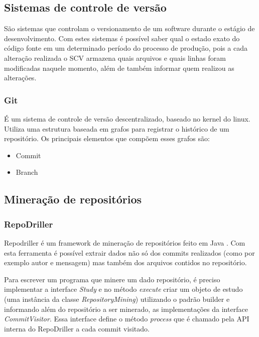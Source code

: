\documentclass[a4paper,12pt]{article}
\numberwithin{figure}{section}
\begin{document}
\subsection{Sistemas de controle de versão}%
\label{sec:scv}
São sistemas que controlam o versionamento de um software durante o estágio de desenvolvimento. Com estes sistemas é possível saber qual o estado exato do código fonte em um determinado período do processo de produção, pois a cada alteração realizada o SCV armazena quais arquivos e quais linhas foram modificadas naquele momento, além de também informar quem realizou as alterações.

\subsubsection{Git}%
É um sistema de controle de versão descentralizado, baseado no kernel do linux. Utiliza uma estrutura baseada em grafos para registrar o histórico de um repositório. Os principais elementos que compõem esses grafos são:

\begin{itemize}
\item{Commit}
\item{Branch}
\end{itemize}






\subsection{Mineração de repositórios}%
\label{sec:mining}


\subsubsection{RepoDriller}%
\label{sec:repodriller}
Repodriller é um framework de mineração de repositórios feito em Java  \cite{repodriller}. Com esta ferramenta é possível extrair dados não só dos commits realizados (como por exemplo autor e mensagem) mas também dos arquivos contidos no repositório.

Para escrever um programa que minere um dado repositório, é preciso implementar a interface \textit{Study} e no método \textit{execute} criar um objeto de estudo (uma instância da classe \textit{RepositoryMining}) utilizando o padrão builder e informando além do repositório a ser minerado, as implementações da interface \textit{CommitVisitor}. Essa interface define o método \textit{process} que é chamado pela API interna do RepoDriller a cada commit visitado.
\end{document}
